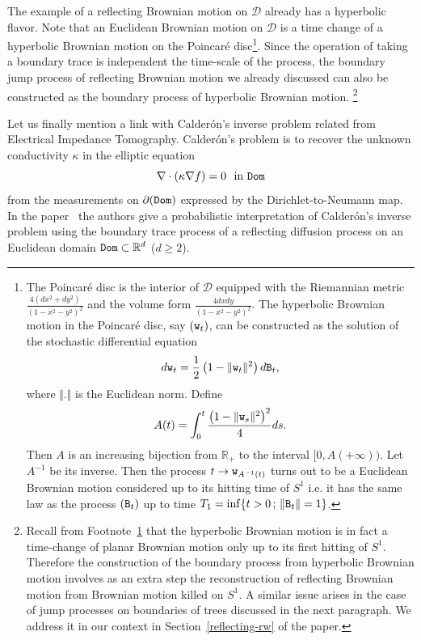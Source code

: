 \documentclass[10pt]{amsart}
\theoremstyle{definition}\newtheorem{defi}[theo]{Definition}\newtheorem{rema}[theo]{Remark}\newtheorem{exam}[theo]{Example}\newtheorem{exem}[theo]{Example}\newtheorem{nota}[theo]{Notation}
\newcommand{\cd}{\mathcal{D}}
\newcommand{\br}{\mathbb{R}}
\begin{document}
The example of a reflecting Brownian motion on $\cd$ already has a hyperbolic flavor. Note that an Euclidean Brownian motion on $\cd$ is a time change of a hyperbolic Brownian motion on the Poincaré disc\footnote{\label{foot3}
The Poincaré disc is the interior of $\cd$ equipped with the Riemannian metric $\frac{4(dx^2+dy^2)}{(1-x^2-y^2)^2}$ and the volume form $\frac{4dxdy}{(1-x^2-y^2)^2}$. The hyperbolic Brownian motion in the Poincaré disc, say $({\tt w}_t)$, can be constructed as the solution of the stochastic differential equation
\[
d{\tt w}_t=\frac {1}{2}\left(1-\Vert {\tt w}_t\Vert^2\right) d{\tt B}_t,
\]
where $\Vert.\Vert$ is the Euclidean norm.
Define
\[
A(t)=\int_0^t \frac {\left(1-\Vert{\tt w}_s\Vert^2\right)^2} {4}ds.
\]
Then $A$ is an increasing bijection from $\br_+$ to the interval $[0,A(+\infty))$. Let $A^{-1}$ be its inverse. Then the process $t\to {\tt w}_{A^{-1}(t)}$ turns out to be a Euclidean Brownian motion considered up to its hitting time of $S^1$ i.e. it has the same law as the process $({\tt B}_t)$ up to time $T_1=\inf\{t>0\,;\, \Vert{\tt B}_t\Vert=1\}$.
}. Since the operation of taking a boundary trace is independent the time-scale of the process, the boundary jump process of reflecting Brownian motion we already discussed can also be constructed as the boundary process of hyperbolic Brownian motion. \footnote{
Recall from Footnote~\ref{foot3} that the hyperbolic Brownian motion is in fact a time-change of planar Brownian motion only up to its first hitting of $S^1$. Therefore the construction of the boundary process from hyperbolic Brownian motion involves as an extra step the reconstruction of reflecting Brownian motion from Brownian motion killed on $S^1$. A similar issue arises in the case of jump processes on boundaries of trees discussed in the next paragraph. We address it in our context in Section~\ref{reflecting-rw} of the paper.
}

Let us finally mention a link with Calderón's inverse problem related from Electrical Impedance Tomography. Calderón's problem is to recover the unknown conductivity $\kappa$ in the elliptic equation
\[
\nabla\cdot(\kappa\nabla f)=0\ \ \text{in}\ {\tt Dom}
\]
from the measurements on $\partial({\tt Dom})$ expressed by the Dirichlet-to-Neumann map. In the paper~\cite{PS} the authors give a probabilistic interpretation of Calderón's inverse problem using the boundary trace process of a reflecting diffusion process on an Euclidean domain ${\tt Dom}\subset\br^d$ ($d\geq2$).
\end{document}
